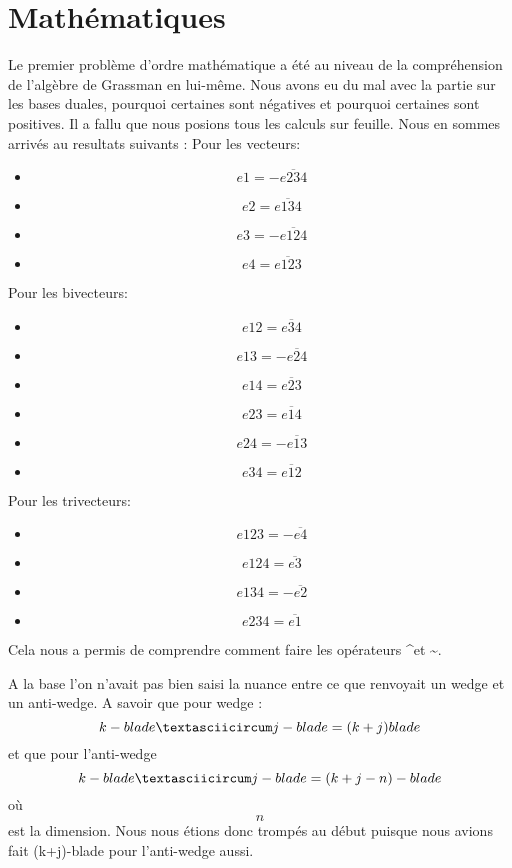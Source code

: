 \documentclass[12pt]{article}
\begin{document}
\section{Mathématiques}
Le premier problème d’ordre mathématique a été au niveau de la compréhension de l’algèbre de Grassman en lui-même. Nous avons eu du mal avec la partie sur les bases duales, pourquoi certaines sont négatives et pourquoi certaines sont positives. Il a fallu que nous posions tous les calculs sur feuille. Nous en sommes arrivés au resultats suivants : 
\newline Pour les vecteurs: 
\begin{itemize}
\item $$e1=-\overline{e234}$$  \item $$e2=\overline{e134}$$ \item $$e3=-\overline{e124}$$ \item $$e4=\overline{e123}$$ 
\end{itemize}
Pour les bivecteurs:
\begin{itemize}
\item $$e12=\overline{e34}$$ \item $$ e13=-\overline{e24}$$ \item $$e14=\overline{e23}$$ \item $$e23=\overline{e14}$$ \item $$e24=-\overline{e13}$$ \item $$e34=\overline{e12}$$

\end{itemize}

Pour les trivecteurs: 
\begin{itemize}
\item $$e123=-\overline{e4} $$ \item $$e124=\overline{e3} $$ \item $$e134=-\overline{e2} $$ \item $$e234=\overline{e1}$$
\end{itemize}

Cela nous a permis de comprendre comment faire les opérateurs \textasciicircum  et \textasciitilde.

A la base l'on n'avait pas bien saisi la nuance entre ce que renvoyait un wedge et un anti-wedge. A savoir que pour wedge : $$k-blade \textasciicircum j-blade = (k+j) blade$$ et que pour l'anti-wedge $$k-blade \textasciicircum j-blade = (k+j-n)-blade$$ où $$n$$ est la dimension.
Nous nous étions donc trompés au début puisque nous avions fait (k+j)-blade pour l'anti-wedge aussi.
\end{document}
